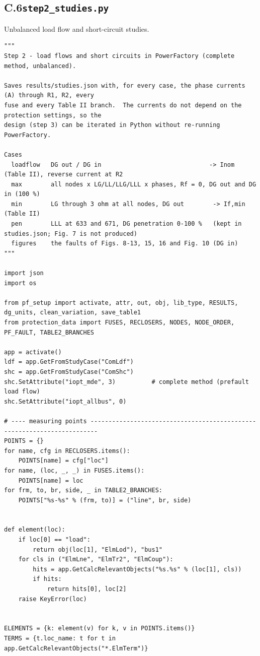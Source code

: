 \documentclass[12pt,a4paper]{article}
\begin{document}
\subsection*{C.6\quad \texttt{step2\_studies.py}}
Unbalanced load flow and short-circuit studies.
\begin{lstlisting}
"""
Step 2 - load flows and short circuits in PowerFactory (complete method, unbalanced).

Saves results/studies.json with, for every case, the phase currents (A) through R1, R2, every
fuse and every Table II branch.  The currents do not depend on the protection settings, so the
design (step 3) can be iterated in Python without re-running PowerFactory.

Cases
  loadflow   DG out / DG in                              -> Inom (Table II), reverse current at R2
  max        all nodes x LG/LL/LLG/LLL x phases, Rf = 0, DG out and DG in (100 %)
  min        LG through 3 ohm at all nodes, DG out        -> If,min (Table II)
  pen        LLL at 633 and 671, DG penetration 0-100 %   (kept in studies.json; Fig. 7 is not produced)
  figures    the faults of Figs. 8-13, 15, 16 and Fig. 10 (DG in)
"""

import json
import os

from pf_setup import activate, attr, out, obj, lib_type, RESULTS, dg_units, clean_variation, save_table1
from protection_data import FUSES, RECLOSERS, NODES, NODE_ORDER, PF_FAULT, TABLE2_BRANCHES

app = activate()
ldf = app.GetFromStudyCase("ComLdf")
shc = app.GetFromStudyCase("ComShc")
shc.SetAttribute("iopt_mde", 3)          # complete method (prefault load flow)
shc.SetAttribute("iopt_allbus", 0)

# ---- measuring points ------------------------------------------------------------------------
POINTS = {}
for name, cfg in RECLOSERS.items():
    POINTS[name] = cfg["loc"]
for name, (loc, _, _) in FUSES.items():
    POINTS[name] = loc
for frm, to, br, side, _ in TABLE2_BRANCHES:
    POINTS["%s-%s" % (frm, to)] = ("line", br, side)


def element(loc):
    if loc[0] == "load":
        return obj(loc[1], "ElmLod"), "bus1"
    for cls in ("ElmLne", "ElmTr2", "ElmCoup"):
        hits = app.GetCalcRelevantObjects("%s.%s" % (loc[1], cls))
        if hits:
            return hits[0], loc[2]
    raise KeyError(loc)


ELEMENTS = {k: element(v) for k, v in POINTS.items()}
TERMS = {t.loc_name: t for t in app.GetCalcRelevantObjects("*.ElmTerm")}



\end{lstlisting}
\end{document}

